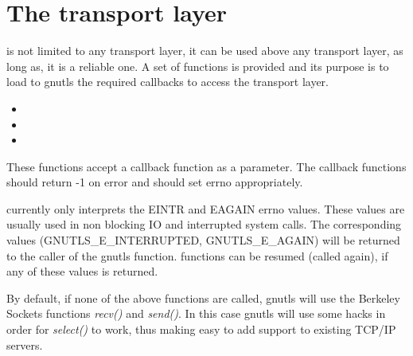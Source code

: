 \section{The transport layer}
\par
\gnutls{} is not limited to any transport layer, it 
can be used above any transport layer, as long as, it is a reliable 
one. A set of functions is provided and its purpose is to load
to gnutls the required callbacks to access the transport layer.

\begin{itemize}
\item {}
\item {}
\item {}
\end{itemize}

These functions accept a callback function as a parameter.
The callback functions should return -1 on error and should set errno 
appropriately.
\par
\gnutls{} currently only interprets the EINTR and EAGAIN errno values. 
These values are usually used in non blocking IO and interrupted system calls.
The corresponding values (GNUTLS\_E\_INTERRUPTED, GNUTLS\_E\_AGAIN) 
will be returned to the caller of the gnutls function. \gnutls{} functions
can be resumed (called again), if any of these values is returned.
\par
By default, if none of the above functions are called, gnutls will use
the Berkeley Sockets functions \emph{recv()} and \emph{send()}. In this case
gnutls will use some hacks in order for \emph{select()} to work, thus
making easy to add \tls{} support to existing TCP/IP servers.
